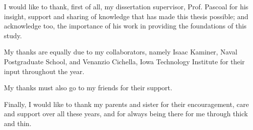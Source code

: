 
\par I would like to thank, first of all, my dissertation supervisor, Prof. Pascoal for his insight, support and sharing of knowledge that has made this thesis possible; and acknowledge too, the importance of his work in providing the foundations of this study.
\par My thanks are equally due to my collaborators, namely Isaac Kaminer, Naval Postgraduate School, and Venanzio Cichella, Iowa Technology Institute for their input throughout the year.
\par My thanks must also go to my friends for their support.
\par Finally, I would like to thank my parents and sister for their encouragement, care and support over all these years, and for always being there for me through thick and thin.

